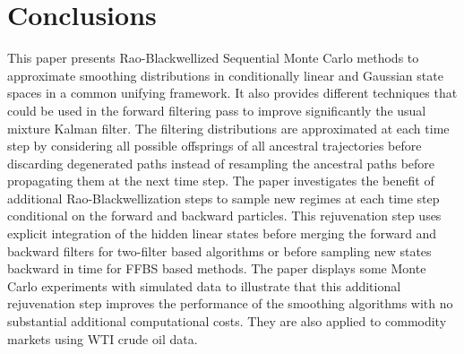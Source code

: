 \documentclass[nolayout]{article}
\theoremstyle{plain}
\theoremstyle{definition}
\newcommand{\1}{\mathbbm{1}}
\begin{document}
\section{Conclusions}
This paper presents Rao-Blackwellized Sequential Monte Carlo methods to approximate smoothing distributions in conditionally linear and Gaussian state spaces in a common unifying framework. It also provides different techniques that could be used in the forward filtering pass to improve significantly the usual mixture Kalman filter. The filtering distributions are approximated at  each time step by considering all possible offsprings of all ancestral trajectories before discarding degenerated paths instead of resampling the ancestral paths before propagating them at the next time step. The paper investigates the benefit of additional Rao-Blackwellization steps to sample new regimes at each time step conditional on the forward and backward particles. This rejuvenation step uses explicit integration of the hidden linear states before merging the forward and backward filters for two-filter based algorithms or before sampling new states backward in time for FFBS based methods.  The paper displays some Monte Carlo experiments with simulated data to illustrate that this additional rejuvenation step improves the performance of the smoothing algorithms with no substantial additional computational costs. They are also applied to commodity markets using WTI crude oil data.

\appendix
\end{document}
